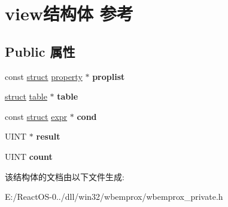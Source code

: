 \hypertarget{structview}{}\section{view结构体 参考}
\label{structview}
\subsection*{Public 属性}
\begin{DoxyCompactItemize}
\item 
\mbox{\label{structview_ada7f09f892453a1d1baa5b7aeab386ce}} 
const \hyperlink{interfacestruct}{struct} \hyperlink{structproperty}{property} $\ast$ {\bfseries proplist}
\item 
\mbox{\label{structview_af97d26033c121114e93a120197243384}} 
\hyperlink{interfacestruct}{struct} \hyperlink{structtable}{table} $\ast$ {\bfseries table}
\item 
\mbox{\label{structview_adbbc922c347b1ba1ffd2776f0a6d8ea4}} 
const \hyperlink{interfacestruct}{struct} \hyperlink{structexpr}{expr} $\ast$ {\bfseries cond}
\item 
\mbox{\label{structview_a32d7d846130ab9dd847dd96ca8f7c740}} 
U\+I\+NT $\ast$ {\bfseries result}
\item 
\mbox{\label{structview_a59823a6097f0abfe702453b71804e94b}} 
U\+I\+NT {\bfseries count}
\end{DoxyCompactItemize}


该结构体的文档由以下文件生成\+:\begin{DoxyCompactItemize}
\item 
E\+:/\+React\+O\+S-\/0../dll/win32/wbemprox/wbemprox\+\_\+private.\+h\end{DoxyCompactItemize}
